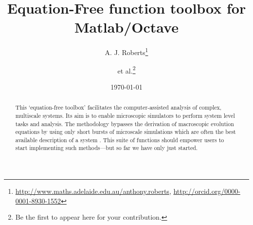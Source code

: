 \documentclass[11pt,a5paper,twoside]{article}
\title{Equation-Free function toolbox for Matlab/Octave}
\author{A. J. Roberts\thanks{%
\url{http://www.maths.adelaide.edu.au/anthony.roberts},
\url{http://orcid.org/0000-0001-8930-1552}}
\and et al.\thanks{Be the first to appear here for your contribution.}}
\date{\today}
\begin{document}

\maketitle

\begin{abstract}
This `equation-free toolbox' facilitates the computer-assisted analysis of complex, multiscale systems.
Its aim is to enable microscopic simulators to perform system level tasks and analysis.
The methodology bypasses the derivation of macroscopic evolution equations by using only short bursts of microscale simulations which are often the best available description of a system
\cite[e.g.]{Kevrekidis09a, Kevrekidis04a, Kevrekidis03b}.
This suite of functions should empower users to start implementing such methods---but so far we have only just started.
\end{abstract}

\tableofcontents







%

\appendix



\end{document}
